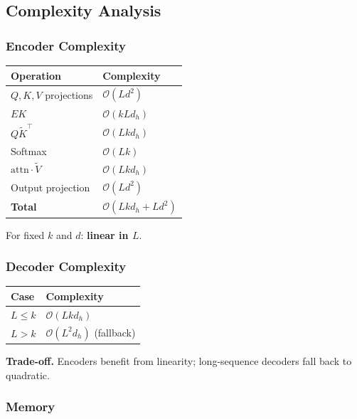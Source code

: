\subsection{Complexity Analysis}

\subsubsection{Encoder Complexity}

\begin{table}[H]
\centering
\small
\begin{tabular}{ll}
\toprule
\textbf{Operation} & \textbf{Complexity} \\
\midrule
$Q, K, V$ projections & $\mathcal{O}(L d^2)$ \\
$E K$ & $\mathcal{O}(k L d_h)$ \\
$Q \tilde{K}^\top$ & $\mathcal{O}(L k d_h)$ \\
Softmax & $\mathcal{O}(L k)$ \\
$\text{attn} \cdot \tilde{V}$ & $\mathcal{O}(L k d_h)$ \\
Output projection & $\mathcal{O}(L d^2)$ \\
\textbf{Total} & $\mathcal{O}(L k d_h + L d^2)$ \\
\bottomrule
\end{tabular}
\end{table}

For fixed $k$ and $d$: \textbf{linear in $L$}.

\subsubsection{Decoder Complexity}

\begin{table}[H]
\centering
\small
\begin{tabular}{ll}
\toprule
\textbf{Case} & \textbf{Complexity} \\
\midrule
$L \leq k$ & $\mathcal{O}(L k d_h)$ \\
$L > k$ & $\mathcal{O}(L^2 d_h)$ (fallback) \\
\bottomrule
\end{tabular}
\end{table}

\textbf{Trade-off.} Encoders benefit from linearity; long-sequence decoders 
fall back to quadratic.

\subsubsection{Memory}

